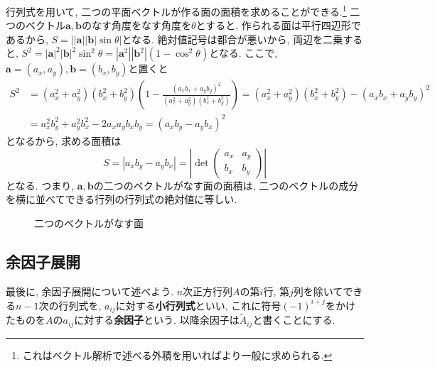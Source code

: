 \documentclass[a4j,dvipdfmx]{jsarticle}
\numberwithin{equation}{section}
\begin{document}
            \clearpage
            行列式を用いて, 二つの平面ベクトルが作る面の面積を求めることができる.\footnote{これはベクトル解析で述べる外積を用いればより一般に求められる.} 二つのベクトル$\bm{a},\bm{b}$のなす角度をなす角度を$\theta$とすると, 
            作られる面は平行四辺形であるから, $S=\left||\bm{a}||\bm{b}|\sin\theta\right|$となる. 絶対値記号は都合が悪いから, 両辺を二乗すると,
            $S^2=|\bm{a}|^2|\bm{b}|^2\sin^2\theta=|\bm{a}^2||\bm{b}^2|(1-\cos^2\theta)$となる.
            ここで, $\bm{a}=(a_x,a_y),\bm{b}=(b_x,b_y)$と置くと
            \begin{align*}
                S^2&=(a_x^2+a_y^2)(b_x^2+b_y^2)\left(1-\frac{(a_xb_x+a_yb_y)^2}{(a_x^2+a_y^2)(b_x^2+b_y^2)}\right)=(a_x^2+a_y^2)(b_x^2+b_y^2)-(a_xb_x+a_yb_y)^2\\
                &=a_x^2b_y^2+a_y^2b_x^2-2a_xa_yb_xb_y=(a_xb_y-a_yb_x)^2
            \end{align*}
            となるから, 求める面積は
            \begin{equation}
                S=|a_xb_y-a_yb_x|=\left|\det\begin{pmatrix}
                    a_x & a_y \\ b_x & b_y
                \end{pmatrix}\right| \label{eq:線形代数:二つのベクトルがなす面の面積}
            \end{equation}
            となる. つまり, $\bm{a},\bm{b}$の二つのベクトルがなす面の面積は, 二つのベクトルの成分を横に並べてできる行列の行列式の絶対値に等しい.
            \begin{figure}[h]
                \centering
                \caption{二つのベクトルがなす面}
            \end{figure}
        \clearpage
        \subsection{余因子展開}
            最後に, 余因子展開について述べよう. $n$次正方行列$A$の第$i$行, 第$j$列を除いてできる$n-1$次の行列式を, $a_{ij}$に対する\textbf{小行列式}といい, 
            これに符号$(-1)^{i+j}$をかけたものを$A$の$a_{ij}$に対する\textbf{余因子}という. 以降余因子は$\tilde{A}_{ij}$と書くことにする.\\
\end{document}
